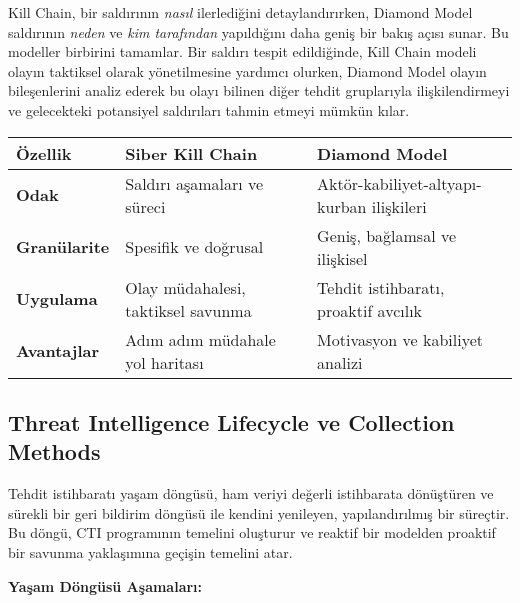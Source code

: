 Kill Chain, bir saldırının \textit{nasıl} ilerlediğini detaylandırırken, Diamond Model saldırının \textit{neden} ve \textit{kim tarafından} yapıldığını daha geniş bir bakış açısı sunar. Bu modeller birbirini tamamlar. Bir saldırı tespit edildiğinde, Kill Chain modeli olayın taktiksel olarak yönetilmesine yardımcı olurken, Diamond Model olayın bileşenlerini analiz ederek bu olayı bilinen diğer tehdit gruplarıyla ilişkilendirmeyi ve gelecekteki potansiyel saldırıları tahmin etmeyi mümkün kılar.

\begin{longtable}{|p{3cm}|p{5.5cm}|p{5.5cm}|}
\hline
\textbf{Özellik} & \textbf{Siber Kill Chain} & \textbf{Diamond Model} \\ \hline
\textbf{Odak} & Saldırı aşamaları ve süreci & Aktör-kabiliyet-altyapı-kurban ilişkileri \\ \hline
\textbf{Granülarite} & Spesifik ve doğrusal & Geniş, bağlamsal ve ilişkisel \\ \hline
\textbf{Uygulama} & Olay müdahalesi, taktiksel savunma & Tehdit istihbaratı, proaktif avcılık \\ \hline
\textbf{Avantajlar} & Adım adım müdahale yol haritası & Motivasyon ve kabiliyet analizi \\ \hline
\end{longtable}

\subsection{Threat Intelligence Lifecycle ve Collection Methods}

Tehdit istihbaratı yaşam döngüsü, ham veriyi değerli istihbarata dönüştüren ve sürekli bir geri bildirim döngüsü ile kendini yenileyen, yapılandırılmış bir süreçtir. Bu döngü, CTI programının temelini oluşturur ve reaktif bir modelden proaktif bir savunma yaklaşımına geçişin temelini atar.

\textbf{Yaşam Döngüsü Aşamaları:}

